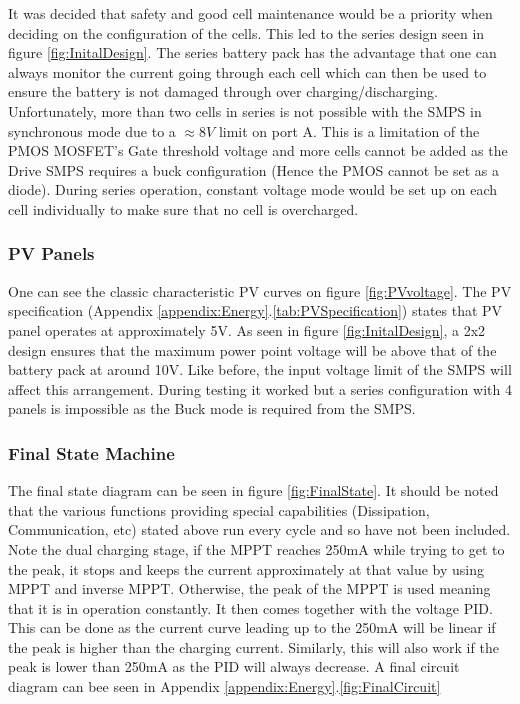\documentclass[10pt,twoside]{article}
\begin{document}
It was decided that safety and good cell maintenance would be a priority when deciding on the configuration of the cells. This led to the series design seen in figure \ref{fig:InitalDesign}. The series battery pack has the advantage that one can always monitor the current going through each cell which can then be used to ensure the battery is not damaged through over charging/discharging. Unfortunately, more than two cells in series is not possible with the SMPS in synchronous mode due to a $\approx 8V$ limit on port A. This is a limitation of the PMOS MOSFET's Gate threshold voltage and more cells cannot be added as the Drive SMPS requires a buck configuration (Hence the PMOS cannot be set as a diode). During series operation, constant voltage mode would be set up on each cell individually to make sure that no cell is overcharged. 

\subsubsection{PV Panels}

One can see the classic characteristic PV curves on figure \ref{fig:PVvoltage}. The PV specification (Appendix \ref{appendix:Energy}.\ref{tab:PVSpecification}) states that PV panel operates at approximately 5V. As seen in figure \ref{fig:InitalDesign}, a 2x2 design ensures that the maximum power point voltage will be above that of the battery pack at around 10V. Like before, the input voltage limit of the SMPS will affect this arrangement. During testing it worked but a series configuration with 4 panels is impossible as the Buck mode is required from the SMPS.

\subsubsection{Final State Machine}

The final state diagram can be seen in figure \ref{fig:FinalState}. It should be noted that the various functions providing special capabilities (Dissipation, Communication, etc) stated above run every cycle and so have not been included. Note the dual charging stage, if the MPPT reaches 250mA while trying to get to the peak, it stops and keeps the current approximately at that value by using MPPT and inverse MPPT. Otherwise, the peak of the MPPT is used meaning that it is in operation constantly. It then comes together with the voltage PID. This can be done as the current curve leading up to the 250mA will be linear if the peak is higher than the charging current. Similarly, this will also work if the peak is lower than 250mA as the PID will always decrease. A final circuit diagram can bee seen in Appendix \ref{appendix:Energy}.\ref{fig:FinalCircuit}
\end{document}
